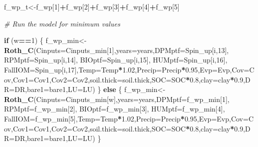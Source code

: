 \documentclass[
  10pt,
  b5paper,
]{book}
\newenvironment{Shaded}{\begin{snugshade}}{\end{snugshade}}
\newcommand{\CommentTok}[1]{\textcolor[rgb]{0.56,0.35,0.01}{\textit{#1}}}
\newcommand{\ControlFlowTok}[1]{\textcolor[rgb]{0.13,0.29,0.53}{\textbf{#1}}}
\newcommand{\DataTypeTok}[1]{\textcolor[rgb]{0.13,0.29,0.53}{#1}}
\newcommand{\DecValTok}[1]{\textcolor[rgb]{0.00,0.00,0.81}{#1}}
\newcommand{\FloatTok}[1]{\textcolor[rgb]{0.00,0.00,0.81}{#1}}
\newcommand{\KeywordTok}[1]{\textcolor[rgb]{0.13,0.29,0.53}{\textbf{#1}}}
\newcommand{\NormalTok}[1]{#1}
\newcommand{\OperatorTok}[1]{\textcolor[rgb]{0.81,0.36,0.00}{\textbf{#1}}}
\begin{document}
\begin{Shaded}
\begin{Highlighting}[]
{\NormalTok{f_wp_t<-f_wp[}\DecValTok{1}\NormalTok{]}\OperatorTok{+}\NormalTok{f_wp[}\DecValTok{2}\NormalTok{]}\OperatorTok{+}\NormalTok{f_wp[}\DecValTok{3}\NormalTok{]}\OperatorTok{+}\NormalTok{f_wp[}\DecValTok{4}\NormalTok{]}\OperatorTok{+}\NormalTok{f_wp[}\DecValTok{5}\NormalTok{]}

\CommentTok{# Run the model for minimum values}

\ControlFlowTok{if}\NormalTok{ (w}\OperatorTok{==}\DecValTok{1}\NormalTok{) \{}
\NormalTok{f_wp_min<-}\KeywordTok{Roth_C}\NormalTok{(}\DataTypeTok{Cinputs=}\NormalTok{Cinputs_min[}\DecValTok{1}\NormalTok{],}\DataTypeTok{years=}\NormalTok{years,}\DataTypeTok{DPMptf=}\NormalTok{Spin_up[i,}\DecValTok{13}\NormalTok{], }\DataTypeTok{RPMptf=}\NormalTok{Spin_up[i,}\DecValTok{14}\NormalTok{], }\DataTypeTok{BIOptf=}\NormalTok{Spin_up[i,}\DecValTok{15}\NormalTok{], }\DataTypeTok{HUMptf=}\NormalTok{Spin_up[i,}\DecValTok{16}\NormalTok{], }\DataTypeTok{FallIOM=}\NormalTok{Spin_up[i,}\DecValTok{17}\NormalTok{],}\DataTypeTok{Temp=}\NormalTok{Temp}\OperatorTok{*}\FloatTok{1.02}\NormalTok{,}\DataTypeTok{Precip=}\NormalTok{Precip}\OperatorTok{*}\FloatTok{0.95}\NormalTok{,}\DataTypeTok{Evp=}\NormalTok{Evp,}\DataTypeTok{Cov=}\NormalTok{Cov,}\DataTypeTok{Cov1=}\NormalTok{Cov1,}\DataTypeTok{Cov2=}\NormalTok{Cov2,}\DataTypeTok{soil.thick=}\NormalTok{soil.thick,}\DataTypeTok{SOC=}\NormalTok{SOC}\OperatorTok{*}\FloatTok{0.8}\NormalTok{,}\DataTypeTok{clay=}\NormalTok{clay}\OperatorTok{*}\FloatTok{0.9}\NormalTok{,}\DataTypeTok{DR=}\NormalTok{DR,}\DataTypeTok{bare1=}\NormalTok{bare1,}\DataTypeTok{LU=}\NormalTok{LU)}
\NormalTok{\} }\ControlFlowTok{else}\NormalTok{ \{}
\NormalTok{f_wp_min<-}\KeywordTok{Roth_C}\NormalTok{(}\DataTypeTok{Cinputs=}\NormalTok{Cinputs_min[w],}\DataTypeTok{years=}\NormalTok{years,}\DataTypeTok{DPMptf=}\NormalTok{f_wp_min[}\DecValTok{1}\NormalTok{], }\DataTypeTok{RPMptf=}\NormalTok{f_wp_min[}\DecValTok{2}\NormalTok{], }\DataTypeTok{BIOptf=}\NormalTok{f_wp_min[}\DecValTok{3}\NormalTok{], }\DataTypeTok{HUMptf=}\NormalTok{f_wp_min[}\DecValTok{4}\NormalTok{], }\DataTypeTok{FallIOM=}\NormalTok{f_wp_min[}\DecValTok{5}\NormalTok{],}\DataTypeTok{Temp=}\NormalTok{Temp}\OperatorTok{*}\FloatTok{1.02}\NormalTok{,}\DataTypeTok{Precip=}\NormalTok{Precip}\OperatorTok{*}\FloatTok{0.95}\NormalTok{,}\DataTypeTok{Evp=}\NormalTok{Evp,}\DataTypeTok{Cov=}\NormalTok{Cov,}\DataTypeTok{Cov1=}\NormalTok{Cov1,}\DataTypeTok{Cov2=}\NormalTok{Cov2,}\DataTypeTok{soil.thick=}\NormalTok{soil.thick,}\DataTypeTok{SOC=}\NormalTok{SOC}\OperatorTok{*}\FloatTok{0.8}\NormalTok{,}\DataTypeTok{clay=}\NormalTok{clay}\OperatorTok{*}\FloatTok{0.9}\NormalTok{,}\DataTypeTok{DR=}\NormalTok{DR,}\DataTypeTok{bare1=}\NormalTok{bare1,}\DataTypeTok{LU=}\NormalTok{LU)}
\NormalTok{\}}

}
\end{Highlighting}
\end{Shaded}
\end{document}
